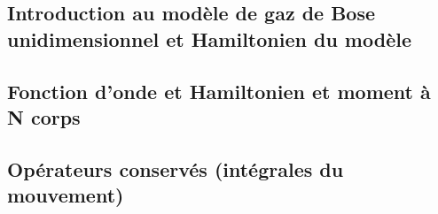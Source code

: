 \subsection{Introduction au modèle de gaz de Bose unidimensionnel et Hamiltonien du modèle}
%




%
%


%


%
 
\subsection{Fonction d’onde et Hamiltonien et moment à N corps}
%


\subsection{Opérateurs conservés (intégrales du mouvement)}
%








%



%

